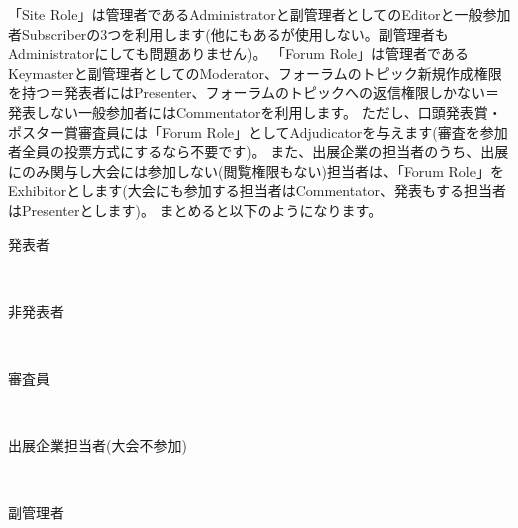 \documentclass[titlepage,10pt,a4paper,uplatex]{jsbook}
\begin{document}
「Site Role」は管理者であるAdministratorと副管理者としてのEditorと一般参加者Subscriberの3つを利用します(他にもあるが使用しない。副管理者もAdministratorにしても問題ありません)。
「Forum Role」は管理者であるKeymasterと副管理者としてのModerator、フォーラムのトピック新規作成権限を持つ＝発表者にはPresenter、フォーラムのトピックへの返信権限しかない＝発表しない一般参加者にはCommentatorを利用します。
ただし、口頭発表賞・ポスター賞審査員には「Forum Role」としてAdjudicatorを与えます(審査を参加者全員の投票方式にするなら不要です)。
また、出展企業の担当者のうち、出展にのみ関与し大会には参加しない(閲覧権限もない)担当者は、「Forum Role」をExhibitorとします(大会にも参加する担当者はCommentator、発表もする担当者はPresenterとします)。
まとめると以下のようになります。

\begin{description}
\item[発表者]\mbox{}\\
\item[非発表者]\mbox{}\\
\item[審査員]\mbox{}\\
\item[出展企業担当者(大会不参加)]\mbox{}\\
\item[副管理者]\mbox{}\\

\end{description}
\end{document}
